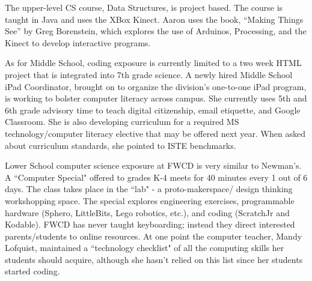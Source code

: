 The upper-level CS course, Data Structures, is project based. The course is taught in Java and uses the XBox Kinect. Aaron uses the book, “Making Things See” by Greg Borenstein, which explores the use of Arduinos, Processing, and the Kinect to develop interactive programs. \par
As for Middle School, coding exposure is currently limited to a two week HTML project that is integrated into 7th grade science. A newly hired Middle School iPad Coordinator, brought on to organize the division's one-to-one iPad program, is working to bolster computer literacy across campus. She currently uses 5th and 6th grade advisory time to teach digital citizenship, email etiquette, and Google Classroom. She is also developing curriculum for a required MS technology/computer literacy elective that may be offered next year. When asked about curriculum standards, she pointed to ISTE benchmarks. \par
Lower School computer science exposure at FWCD is very similar to Newman's. A ``Computer Special" offered to grades K-4 meets for 40 minutes every 1 out of 6 days. The class takes place in the ``lab" - a proto-makerspace/ design thinking workshopping space. The special explores engineering exercises, programmable hardware (Sphero, LittleBits, Lego robotics, etc.), and coding (ScratchJr and Kodable). FWCD has never taught keyboarding; instead they direct interested parents/students to online resources. At one point the computer teacher, Mandy Lofquist, maintained a ``technology checklist" of all the computing skills her students should acquire, although she hasn't relied on this list since her students started coding. \par



